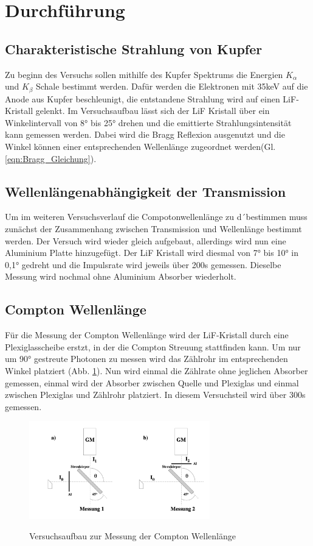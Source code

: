 \section{Durchführung}
\label{sec:Durchfuehrung}
\subsection{Charakteristische Strahlung von Kupfer}
Zu beginn des Versuchs sollen mithilfe des Kupfer Spektrums die Energien $K_{\alpha}$ und $K_{\beta}$ Schale bestimmt werden.
Dafür werden die Elektronen mit 35keV auf die Anode aus Kupfer beschleunigt, die entstandene Strahlung wird auf einen LiF-Kristall gelenkt.
Im Versuchsaufbau lässt sich der LiF Kristall über ein Winkelintervall von 8° bis 25° drehen und die emittierte Strahlungsintensität kann gemessen werden.
Dabei wird die Bragg Reflexion ausgenutzt und die Winkel können einer entsprechenden Wellenlänge zugeordnet werden(Gl. \ref{eqn:Bragg_Gleichung}).
\subsection{Wellenlängenabhängigkeit der Transmission}
Um im weiteren Versuchsverlauf die Compotonwellenlänge zu d´bestimmen muss zunächst der Zusammenhang zwischen Transmission und Wellenlänge bestimmt werden.
Der Versuch wird wieder gleich aufgebaut, allerdings wird nun eine Aluminium Platte hinzugefügt.
Der LiF Kristall wird diesmal von 7° bis 10° in 0,1° gedreht und die Impulsrate wird jeweils über 200s gemessen.
Dieselbe Messung wird nochmal ohne Aluminium Absorber wiederholt.

\subsection{Compton Wellenlänge}
Für die Messung der Compton Wellenlänge wird der LiF-Kristall durch eine Plexiglasscheibe erstzt, in der die Compton Streuung stattfinden kann. Um nur um 90° gestreute Photonen zu messen wird das Zählrohr im entsprechenden Winkel platziert (Abb. \ref{fig:Versuchsaufbau_2}).
Nun wird einmal die Zählrate ohne jeglichen Absorber gemessen, einmal wird der Absorber zwischen Quelle und Plexiglas und einmal zwischen Plexiglas und Zählrohr platziert.
In diesem Versuchsteil wird über 300s gemessen.
\begin{figure}
    \centering
    \includegraphics[width=0.7\textwidth]{bilder/Exp_Aufbau_2.png}
    \label{fig:Versuchsaufbau_2}
    \caption{Versuchsaufbau zur Messung der Compton Wellenlänge}
\end{figure}
